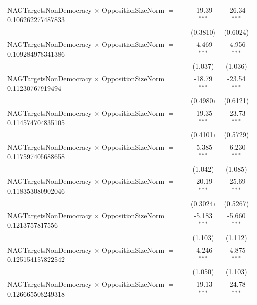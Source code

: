\begin{tabular}{lcc}
   NAGTargetsNonDemocracy $\times$ OppositionSizeNorm $=$ 0.106262277487833     & -19.39$^{***}$       & -26.34$^{***}$\\   
                                                                                & (0.3810)             & (0.6024)\\   
   NAGTargetsNonDemocracy $\times$ OppositionSizeNorm $=$ 0.109284978341386     & -4.469$^{***}$       & -4.956$^{***}$\\   
                                                                                & (1.037)              & (1.036)\\   
   NAGTargetsNonDemocracy $\times$ OppositionSizeNorm $=$ 0.11230767919494      & -18.79$^{***}$       & -23.54$^{***}$\\   
                                                                                & (0.4980)             & (0.6121)\\   
   NAGTargetsNonDemocracy $\times$ OppositionSizeNorm $=$ 0.114574704835105     & -19.35$^{***}$       & -23.73$^{***}$\\   
                                                                                & (0.4101)             & (0.5729)\\   
   NAGTargetsNonDemocracy $\times$ OppositionSizeNorm $=$ 0.117597405688658     & -5.385$^{***}$       & -6.230$^{***}$\\   
                                                                                & (1.042)              & (1.085)\\   
   NAGTargetsNonDemocracy $\times$ OppositionSizeNorm $=$ 0.118353080902046     & -20.19$^{***}$       & -25.69$^{***}$\\   
                                                                                & (0.3024)             & (0.5267)\\   
   NAGTargetsNonDemocracy $\times$ OppositionSizeNorm $=$ 0.1213757817556       & -5.183$^{***}$       & -5.660$^{***}$\\   
                                                                                & (1.103)              & (1.112)\\   
   NAGTargetsNonDemocracy $\times$ OppositionSizeNorm $=$ 0.125154157822542     & -4.246$^{***}$       & -4.875$^{***}$\\   
                                                                                & (1.050)              & (1.103)\\   
   NAGTargetsNonDemocracy $\times$ OppositionSizeNorm $=$ 0.126665508249318     & -19.13$^{***}$       & -24.78$^{***}$\\   

\end{tabular}

